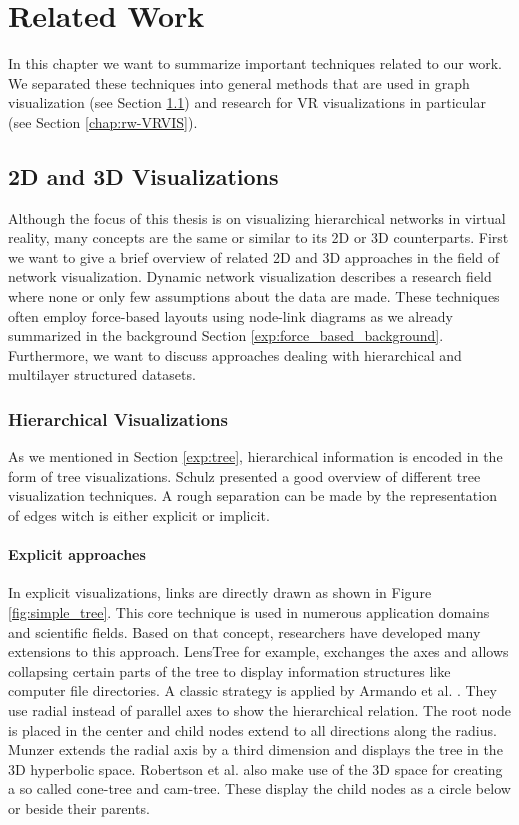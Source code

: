 \chapter{Related Work}

In this chapter we want to summarize important techniques related to our work. We separated these techniques into general methods that are used in graph visualization (see Section \ref{chap:rw-2d3dLayout}) and research for VR visualizations in particular (see Section \ref{chap:rw-VRVIS}). 
\section{2D and 3D Visualizations}
\label{chap:rw-2d3dLayout}
Although the focus of this thesis is on visualizing hierarchical networks in virtual reality, many concepts are the same or similar to its 2D or 3D counterparts. First we want to give a brief overview of related 2D and 3D approaches in the field of network visualization.
Dynamic network visualization describes a research field where none or only few assumptions about the data are made. These techniques often employ force-based layouts using node-link diagrams as we already summarized in the background Section \ref{exp:force_based_background}. Furthermore, we want to discuss approaches dealing with hierarchical and multilayer structured datasets.

\subsection{Hierarchical Visualizations}

As we mentioned in Section \ref{exp:tree}, hierarchical information is encoded in the form of tree visualizations.
Schulz \cite{schulz_treevisnet_2011} presented a good overview of different tree visualization techniques. A rough separation can be made by the representation of edges witch is either explicit or implicit. 

\subsubsection{Explicit approaches}
In explicit visualizations, links are directly drawn as shown in Figure \ref{fig:simple_tree}. This core technique is used in numerous application domains and scientific fields. Based on that concept, researchers have developed many extensions to this approach.
LensTree \cite{song_lenstree_2006} for example, exchanges the axes and allows collapsing certain parts of the tree to display information structures like computer file directories. 
A classic strategy is applied by Armando et al. \cite{arce-orozco_radial_2017}. They use radial instead of parallel axes to show the hierarchical relation. The root node is placed in the center and child nodes extend to all directions along the radius.
Munzer \cite{munzner_h3_1997} extends the radial axis by a third dimension and displays the tree in the 3D hyperbolic space.
Robertson et al. \cite{robertson_cone_1991} also make use of the 3D space for creating a so called cone-tree and cam-tree. These display the child nodes as a circle below or beside their parents.  

